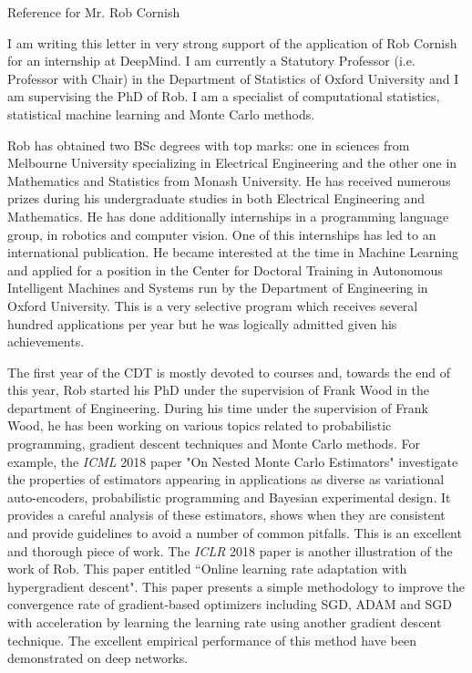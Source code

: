 \documentclass{letter}
\begin{document}
 \bigskip
\bigskip
\begin{letter}{Reference for Mr. Rob Cornish}

\opening{}

\bigskip
\bigskip
I am writing this letter in very strong support of the application of Rob Cornish for an internship at DeepMind.
I am currently a Statutory Professor (i.e. Professor with Chair) in the Department of Statistics of Oxford University and I am supervising the PhD of Rob. I am a specialist of computational statistics, statistical machine learning and Monte Carlo methods.

\bigskip
Rob has obtained two BSc degrees with top marks: one in sciences from Melbourne University specializing in Electrical Engineering and the other one in Mathematics and Statistics from Monash University. He has received numerous prizes during his undergraduate studies in both Electrical Engineering and Mathematics. He has done additionally internships in a programming language group, in robotics and computer vision. One of this internships has led to an international publication. He became interested at the time in Machine Learning and applied for a position in the Center for Doctoral Training in Autonomous Intelligent Machines and Systems run by the Department of Engineering in Oxford University. This is a very selective program which receives several hundred applications per year but he was logically admitted given his achievements.

\bigskip
The first year of the CDT is mostly devoted to courses and, towards the end of this year, Rob started his PhD under the supervision of Frank Wood in the department of Engineering.
During his time under the supervision of Frank Wood, he has been working on various topics related to probabilistic programming, gradient descent techniques and Monte Carlo methods. For example, the \emph{ICML} 2018 paper "On Nested Monte Carlo Estimators" investigate the properties of estimators appearing in applications as diverse as variational auto-encoders, probabilistic programming and Bayesian experimental design. It provides a careful analysis of these estimators, shows when they are consistent and provide guidelines to avoid a number of common pitfalls. This is an excellent and thorough piece of work. The \emph{ICLR} 2018 paper is another illustration of the work of Rob. This paper entitled ``Online learning rate adaptation with hypergradient descent". This paper presents a simple methodology to improve the convergence rate of gradient-based optimizers including SGD, ADAM and SGD with acceleration by learning the learning rate using another gradient descent technique. The excellent empirical performance of this method have been demonstrated on deep networks.


\end{letter}
\end{document}
